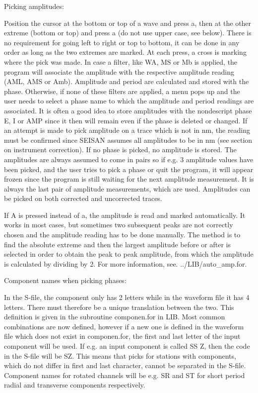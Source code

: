 Picking amplitudes: 

Position the cursor at the bottom or top of a wave and press a, then at the other extreme (bottom or top) and press a (do not use upper case, see below). There is no requirement for going left to right or top to bottom, it can be done in any order as long as the two extremes are marked. At each press, a cross is marking where the pick was made. In case a filter, like WA, MS or Mb is applied, the program will associate the amplitude with the respective amplitude reading (AML, AMS or Amb).  Amplitude and period are calculated and stored with the phase. Otherwise, if none of these filters are applied, a menu pops up and the user needs to select a phase name to which the amplitude and period readings are associated. It is often a good idea to store amplitudes with the nondescript phase E, I or AMP since it then will remain even if the phase is deleted or changed. If an attempt is made to pick amplitude on a trace which is not in nm, the reading must be confirmed since SEISAN assumes all amplitudes to be in nm (see section on instrument correction). If no phase is picked, no amplitude is stored. The amplitudes are always assumed to come in pairs so if 
e.g. 3 amplitude values have been picked, and the user tries to pick a phase or quit the program, it will appear frozen since the program is still waiting for the next amplitude measurement. It is always the last pair of amplitude measurements, which are used. Amplitudes can be picked on both corrected and uncorrected traces. 

If A is pressed instead of a, the amplitude is read and marked automatically. It works in most cases, but sometimes two subsequent peaks are not correctly chosen and the amplitude reading has to be done manually. The method is to find the absolute extreme and then the largest amplitude before or after is selected in order to obtain the peak to peak amplitude, from which the amplitude is calculated by dividing by 2. For more information, see.  ../LIB/auto\_amp.for. 

Component names when picking phases: 

In the S-file, the component only has 2 letters while in the waveform file it has 4 letters. There must therefore be a unique translation between the two. This definition is given in the subroutine componen.for in LIB. Most common combinations are now defined, however if a new one is defined in the waveform file which does not exist in componen.for, the first and last letter of the input component will be used. If e.g. an input component is called SS Z, then the code in the S-file will be SZ. This means that picks for stations with components, which do not differ in first and last character, cannot be separated in the S-file. Component names for rotated channels will be e.g. SR and ST for short period radial and transverse components respectively. 


